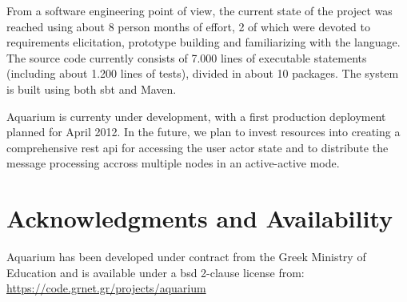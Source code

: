 \documentclass[letterpaper,twocolumn,10pt]{article}
\begin{document}
From a software engineering point of view, the current state of the project was
reached using about 8 person months of effort, 2 of which were devoted to
requirements elicitation, prototype building and familiarizing with the
language. The source code currently consists of 7.000 lines of executable
statements (including about 1.200 lines of tests), divided in about 10
packages. The system is built using both {\sc sbt} and Maven.

Aquarium is currenty under development, with a first production deployment
planned for April 2012. In the future, we plan to invest resources into
creating a comprehensive {\sc rest api} for accessing the user actor state and
to distribute the message processing accross multiple nodes in an active-active
mode.

\section{Acknowledgments and Availability}

Aquarium has been developed under contract from the Greek Ministry of Education and is available under a {\sc bsd} 2-clause license from:
\url{https://code.grnet.gr/projects/aquarium}

{\footnotesize 
}
\end{document}
